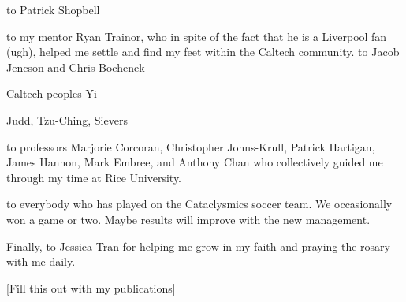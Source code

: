 \documentclass[12pt]{caltech_thesis}
\begin{document}
\begin{acknowledgements}
    \Ty to Patrick Shopbell

    \Ty to my mentor Ryan Trainor, who in spite of the fact that he is a Liverpool fan (ugh), helped
    me settle and find my feet within the Caltech community. \Ty to Jacob Jencson and Chris Bochenek

    Caltech peoples
    Yi

    Judd, Tzu-Ching, Sievers


    \Ty to professors Marjorie Corcoran, Christopher Johns-Krull, Patrick Hartigan, James
    Hannon, Mark Embree, and Anthony Chan who collectively guided me through my time at Rice
    University.

    \Ty to everybody who has played on the Cataclysmics soccer team. We occasionally won a game or
    two. Maybe results will improve with the new management.

    Finally, \ty to Jessica Tran for helping me grow in my faith and praying the rosary with
    me daily.



\end{acknowledgements}

\begin{abstract}
    [This abstract must provide a succinct and informative condensation of your work. Candidates are welcome to prepare a lengthier abstract for inclusion in the dissertation, and provide a shorter one in the CaltechTHESIS record.]
\end{abstract}


[Fill this out with my publications]

\tableofcontents
\listoffigures
\listoftables

\blankpage
\blankpage

\mainmatter







%
\end{document}
